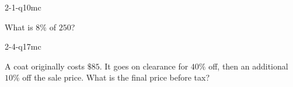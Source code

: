 \begin{practiceQuestion}{2-1-q10}{mc}
\begin{questionText}
What is $8\%$ of $250$?
\end{questionText}
\end{practiceQuestion}

\begin{practiceQuestion}{2-4-q17}{mc}
\begin{questionText}
A coat originally costs $\$85$. It goes on clearance for $40\%$ off, then an additional $10\%$ off the sale price. What is the final price before tax?
\end{questionText}
\end{practiceQuestion}

